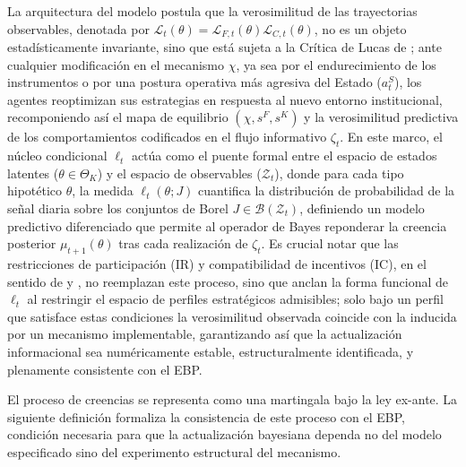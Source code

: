 \documentclass[review,authoryear,12pt]{elsarticle}
\theoremstyle{plain}
\theoremstyle{definition}
\newcommand{\ThetaK}{\Theta_K}
\newcommand{\1}{\mathbf{1}}
\begin{document}
La arquitectura del modelo postula que la verosimilitud de las trayectorias observables, denotada por $\mathcal{L}_t(\theta)=\mathcal{L}_{F,t}(\theta)\mathcal{L}_{C,t}(\theta)$, no es un objeto estadísticamente invariante, sino que está sujeta a la Crítica de Lucas de \citet{Lucas1976}; ante cualquier modificación en el mecanismo $\chi$, ya sea por el endurecimiento de los instrumentos o por una postura operativa más agresiva del Estado ($a_t^S$), los agentes reoptimizan sus estrategias en respuesta al nuevo entorno institucional, recomponiendo así el mapa de equilibrio $(\chi, s^F, s^K)$ y la verosimilitud predictiva de los comportamientos codificados en el flujo informativo $\zeta_t$. En este marco, el núcleo condicional $\ell_t$ actúa como el puente formal entre el espacio de estados latentes ($\theta \in \ThetaK$) y el espacio de observables ($\mathcal{Z}_t$), donde para cada tipo hipotético $\theta$, la medida $\ell_t(\theta; J)$ cuantifica la distribución de probabilidad de la señal diaria sobre los conjuntos de Borel $J \in \mathcal{B}(\mathcal{Z}_t)$, definiendo un modelo predictivo diferenciado que permite al operador de Bayes reponderar la creencia posterior $\mu_{t+1}(\theta)$ tras cada realización de $\zeta_t$. Es crucial notar que las restricciones de participación (IR) y compatibilidad de incentivos (IC), en el sentido de \citet{Myerson1979IC} y \citet{BoltonDewatripont2005}, no reemplazan este proceso, sino que anclan la forma funcional de $\ell_t$ al restringir el espacio de perfiles estratégicos admisibles; solo bajo un perfil que satisface estas condiciones la verosimilitud observada coincide con la inducida por un mecanismo implementable, garantizando así que la actualización informacional sea numéricamente estable, estructuralmente identificada, y plenamente consistente con el EBP.

El proceso de creencias se representa como una martingala bajo la ley ex-ante. La siguiente definición formaliza la consistencia de este proceso con el EBP, condición necesaria para que la actualización bayesiana dependa no del modelo especificado sino del experimento estructural del mecanismo.
\end{document}
